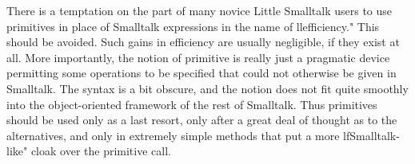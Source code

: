 There is a temptation on the part of many novice Little Smalltalk users to use
primitives in place of Smalltalk expressions in the name of llefficiency." This
should be avoided. Such gains in efficiency are usually negligible, if they
exist at all. More importantly, the notion of primitive is really just a
pragmatic device permitting some operations to be specified that could not
otherwise be given in Smalltalk. The syntax is a bit obscure, and the notion
does not fit quite smoothly into the object-oriented framework of the rest of
Smalltalk. Thus primitives should be used only as a last resort, only after a
great deal of thought as to the alternatives, and only in extremely simple
methods that put a more lfSmalltalk-like" cloak over the primitive call.

